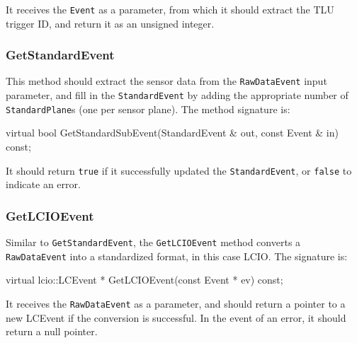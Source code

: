 It receives the \texttt{Event} as a parameter, from which it should extract the \gls{TLU} trigger ID,
and return it as an unsigned integer.

\subsubsection{GetStandardEvent}
This method should extract the sensor data from the \texttt{RawDataEvent} input parameter,
and fill in the \texttt{StandardEvent} by adding the appropriate number of \texttt{StandardPlane}s
(one per sensor plane).
The method signature is:
\begin{listing}
virtual bool GetStandardSubEvent(StandardEvent & out,
                                 const Event & in) const;
\end{listing}

It should return \texttt{true} if it successfully updated the \texttt{StandardEvent}, or \texttt{false} to indicate an error.

\subsubsection{GetLCIOEvent}
Similar to \texttt{GetStandardEvent}, the \texttt{GetLCIOEvent} method converts a \texttt{RawDataEvent}
into a standardized format, in this case \gls{LCIO}.
The signature is:
\begin{listing}
virtual lcio::LCEvent * GetLCIOEvent(const Event * ev) const;
\end{listing}

It receives the \texttt{RawDataEvent} as a parameter, and should return a pointer to a new LCEvent
if the conversion is successful. In the event of an error, it should return a null pointer.
